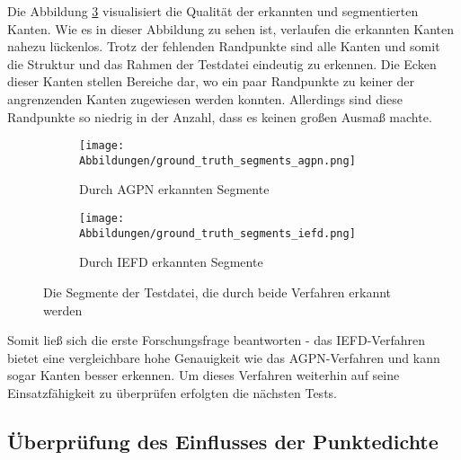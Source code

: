 Die Abbildung \ref{fig: segments_comparision_grnd_trth} visualisiert die Qualität der erkannten und segmentierten Kanten. Wie es in dieser Abbildung zu sehen ist, verlaufen die erkannten Kanten nahezu lückenlos. Trotz der fehlenden Randpunkte sind alle Kanten und somit die Struktur und das Rahmen der Testdatei eindeutig zu erkennen. Die Ecken dieser Kanten stellen Bereiche dar, wo ein paar Randpunkte zu keiner der angrenzenden Kanten zugewiesen werden konnten. Allerdings sind diese Randpunkte so niedrig in der Anzahl, dass es keinen großen Ausmaß machte.

\begin{figure}[h]
	\centering
	\begin{subfigure}[h]{0.49\textwidth}
		\texttt{[image: Abbildungen/ground\_truth\_segments\_agpn.png]}
		\centering
		\caption{Durch AGPN erkannten Segmente}
		\label{fig: agpn_segments_grnd_trth}
	\end{subfigure}
	\hfil
	\begin{subfigure}[h]{0.49\textwidth}
		\texttt{[image: Abbildungen/ground\_truth\_segments\_iefd.png]}
		\centering
		\caption{Durch IEFD erkannten Segmente}
		\label{fig: iefd_segments_grnd_trth}
	\end{subfigure}
	\caption{Die Segmente der Testdatei, die durch beide Verfahren erkannt werden}
	\label{fig: segments_comparision_grnd_trth}
\end{figure}

Somit ließ sich die erste Forschungsfrage beantworten - das IEFD-Verfahren bietet eine vergleichbare hohe Genauigkeit wie das AGPN-Verfahren und kann sogar Kanten besser erkennen. Um dieses Verfahren weiterhin auf seine Einsatzfähigkeit zu überprüfen erfolgten die nächsten Tests.

\subsection{Überprüfung des Einflusses der Punktedichte}